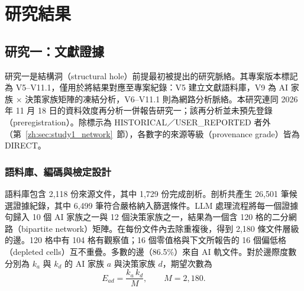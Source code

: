 
\chapter{研究結果}
\label{zh:ch:results}

\section{研究一：文獻證據}
\label{zh:sec:study1}

研究一是結構洞（structural hole）前提最初被提出的研究脈絡。其專案版本標記為 V5--V11.1，僅用於將結果對應至專案紀錄：V5 建立文獻語料庫，V9 為 AI 家族 $\times$ 決策家族矩陣的凍結分析，V6--V11.1 則為網路分析脈絡。本研究連同 2026 年 11 月 18 日的資料效度再分析一併報告研究一；該再分析並未預先登錄（preregistration）。除標示為 HISTORICAL／USER\_REPORTED 者外（第~\ref{zh:sec:study1_network}~節），各數字的來源等級（provenance grade）皆為 DIRECT。

\subsection{語料庫、編碼與檢定設計}
\label{zh:sec:study1_corpus}

語料庫包含 2,118 份來源文件，其中 1,729 份完成剖析。剖析共產生 26,501 筆候選證據紀錄，其中 6,499 筆符合嚴格納入篩選條件。LLM 處理流程將每一個證據句歸入 10 個 AI 家族之一與 12 個決策家族之一，結果為一個含 120 格的二分網路（bipartite network）矩陣。在每份文件內去除重複後，得到 2,180 條文件層級的邊。120 格中有 104 格有觀察值；16 個零值格與下文所報告的 16 個偏低格（depleted cells）互不重疊。多數的邊（86.5\%）來自 AI 軌文件。對於邊際度數分別為 $k_a$ 與 $k_d$ 的 AI 家族 $a$ 與決策家族 $d$，期望次數為
\begin{equation}
E_{ad} = \frac{k_a\,k_d}{M}, \qquad M = 2{,}180 .
\label{zh:eq:s1_expected}
\end{equation}


